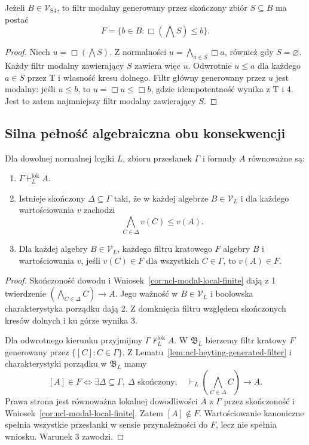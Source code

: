 \begin{wniosek}
\label{cor:ncl-modal-S4-principal-filter}
Jeżeli $B\in\mathcal V_{\mathrm{S4}}$, to filtr
modalny generowany przez skończony zbiór
$S\subseteq B$ ma postać
\[
 F=\{b\in B:\Box(\bigwedge S)\leq b\}.
\]
\end{wniosek}
\begin{proof}
Niech $u=\Box(\bigwedge S)$.
Z normalności $u=\bigwedge_{a\in S}\Box a$,
również gdy $S=\varnothing$.
Każdy filtr modalny zawierający $S$ zawiera
więc $u$. Odwrotnie $u\leq a$ dla każdego
$a\in S$ przez T i własność kresu dolnego.
Filtr główny generowany przez $u$ jest modalny:
jeśli $u\leq b$, to $u=\Box u\leq\Box b$,
gdzie idempotentność wynika z T i 4.
Jest to zatem najmniejszy filtr modalny
zawierający $S$.
\end{proof}

\subsection{Silna pełność algebraiczna obu konsekwencji}

\begin{twierdzenie}
\label{thm:ncl-modal-local-algebra-completeness}
Dla dowolnej normalnej logiki $L$, zbioru
przesłanek $\Gamma$ i formuły $A$ równoważne są:
\begin{enumerate}
\item $\Gamma\vdash_L^{\mathrm{lok}}A$.
\item Istnieje skończony $\Delta\subseteq\Gamma$
      taki, że w każdej algebrze $B\in\mathcal V_L$
      i dla każdego wartościowania $v$ zachodzi
      \[
       \bigwedge_{C\in\Delta}v(C)\leq v(A).
      \]
\item Dla każdej algebry $B\in\mathcal V_L$,
      każdego filtru kratowego $F$ algebry $B$
      i wartościowania $v$, jeśli $v(C)\in F$
      dla wszystkich $C\in\Gamma$, to $v(A)\in F$.
\end{enumerate}
\end{twierdzenie}
\begin{proof}
Skończoność dowodu i
Wniosek~\ref{cor:ncl-modal-local-finite}
dają z 1 twierdzenie
$(\bigwedge_{C\in\Delta}C)\to A$.
Jego ważność w $B\in\mathcal V_L$ i
boolowska charakterystyka porządku dają 2.
Z domknięcia filtru względem skończonych
kresów dolnych i ku górze wynika 3.

Dla odwrotnego kierunku przyjmijmy
$\Gamma\nvdash_L^{\mathrm{lok}} A$.
W $\mathfrak B_L$ bierzemy filtr kratowy
$F$ generowany przez $\{[C]:C\in\Gamma\}$.
Z Lematu~\ref{lem:ncl-heyting-generated-filter}
i charakterystyki porządku w $\mathfrak B_L$
mamy
\[
 [A]\in F
 \iff\exists\Delta\subseteq\Gamma,\ \Delta\text{ skończony},
 \quad\vdash_L\left(\bigwedge_{C\in\Delta}C\right)\to A.
\]
Prawa strona jest równoważna lokalnej dowodliwości
$A$ z $\Gamma$ przez skończoność i
Wniosek~\ref{cor:ncl-modal-local-finite}.
Zatem $[A]\notin F$.
Wartościowanie kanoniczne spełnia wszystkie
przesłanki w sensie przynależności do $F$,
lecz nie spełnia wniosku. Warunek 3 zawodzi.
\end{proof}

